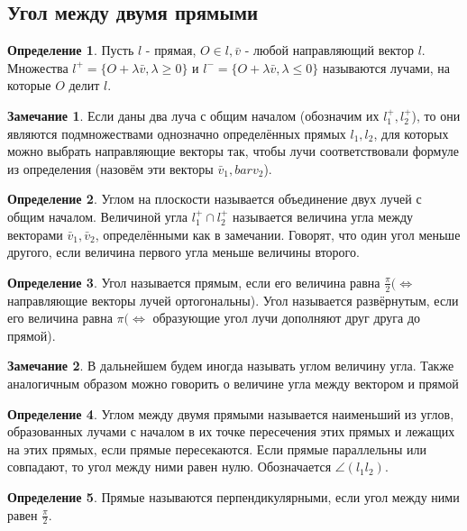 \documentclass[a4paper, 12pt]{article}
\theoremstyle{definition}
\newtheorem*{definition}{Определение}
\newtheorem*{remark}{Замечание}
\begin{document}
	\subsection{Угол между двумя прямыми}
	\begin{definition}
		Пусть $l$ - прямая, $O \in l, \bar{v}$ - любой направляющий вектор $l$. Множества $l^{+} = \{O + \lambda\bar{v}, \lambda \geqslant 0\}$ и $l^{-} = \{O + \lambda\bar{v}, \lambda \leqslant 0\}$ называются лучами, на которые $O$ делит $l$. 
	\end{definition}
	\begin{remark}
		Если даны два луча с общим началом (обозначим их $l_{1}^{+}, l_{2}^{+}$), то они являются подмножествами однозначно определённых прямых $l_{1}, l_{2}$, для которых можно выбрать направляющие векторы так, чтобы лучи соответствовали формуле из определения (назовём эти векторы $\bar{v}_{1}, bar{v}_{2}$).
	\end{remark}
	\begin{definition}
		Углом на плоскости называется объединение двух лучей с общим началом. Величиной угла $l_{1}^{+}\cap l_{2}^{+}$ называется величина угла между векторами $\bar{v}_{1}, \bar{v}_{2}$, определёнными как в замечании. Говорят, что один угол меньше другого, если величина первого угла меньше величины второго.
	\end{definition}
	\begin{definition}
		Угол называется прямым, если его величина равна $\frac{\pi}{2} (\Leftrightarrow$ направляющие векторы лучей ортогональны). Угол называется развёрнутым, если его величина равна $\pi (\Leftrightarrow$ образующие угол лучи дополняют друг друга до прямой).
	\end{definition}
	\begin{remark}
		В дальнейшем будем иногда называть углом величину угла. Также аналогичным образом можно говорить о величине угла между вектором и прямой
	\end{remark}
	\begin{definition}
		Углом между двумя прямыми называется наименьший из углов, образованных лучами с началом в их точке пересечения этих прямых и лежащих на этих прямых, если прямые пересекаются. Если прямые параллельны или совпадают, то угол между ними равен нулю. Обозначается $\angle({l_{1}}{l_{2}})$.
	\end{definition}
	\begin{definition}
		Прямые называются перпендикулярными, если угол между ними равен $\frac{\pi}{2}$.
	\end{definition}
\end{document}
